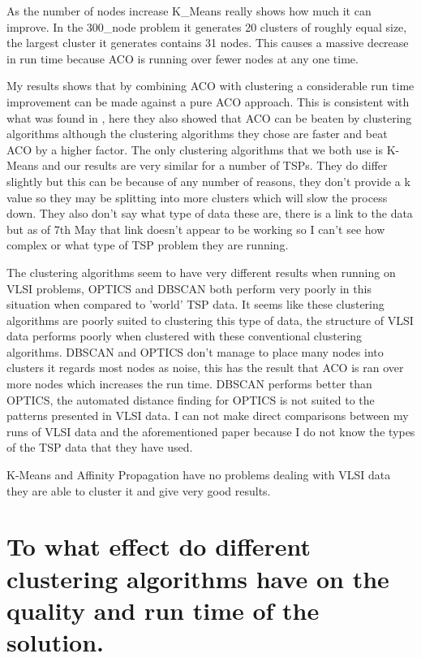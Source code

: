 As the number of nodes increase K\_Means really shows how much it can improve. In the 300\_node problem it generates 20 clusters of roughly equal size, the largest cluster it generates contains 31 nodes. This causes a massive decrease in run time because ACO is running over fewer nodes at any one time.

My results shows that by combining ACO with clustering a considerable run time improvement can be made against a pure ACO approach. This is consistent with what was found in \cite{pang_chao-yang_ben-qiong_zhang_jie_wei_shan_zheng-chao_2014}, here they also showed that ACO can be beaten by clustering algorithms although the clustering algorithms they chose are faster and beat ACO by a higher factor. The only clustering algorithms that we both use is K-Means and our results are very similar for a number of TSPs. They do differ slightly but this can be because of any number of reasons, they don't provide a k value so they may be splitting into more clusters which will slow the process down. They also don't say what type of data these are, there is a link to the data but as of 7th May that link doesn't appear to be working so I can't see how complex or what type of TSP problem they are running.

The clustering algorithms seem to have very different results when running on VLSI problems, OPTICS and DBSCAN both perform very poorly in this situation when compared to 'world' TSP data. It seems like these clustering algorithms are poorly suited to clustering this type of data, the structure of VLSI data performs poorly when clustered with these conventional clustering algorithms. DBSCAN and OPTICS don't manage to place many nodes into clusters it regards most nodes as noise, this has the result that ACO is ran over more nodes which increases the run time. DBSCAN performs better than OPTICS, the automated distance finding for OPTICS is not suited to the patterns presented in VLSI data. I can not make direct comparisons between my runs of VLSI data and the aforementioned paper because I do not know the types of the TSP data that they have used.

K-Means and Affinity Propagation have no problems dealing with VLSI data they are able to cluster it and give very good results.

\section{To what effect do different clustering algorithms have on the quality and run time of the solution.}\label{sec:question2}

